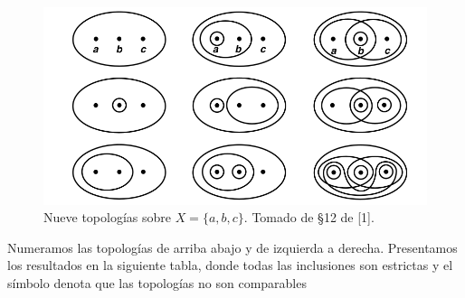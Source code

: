 \documentclass{article}
\newcommand{\xmark}{\ding{55}}
\begin{document}
\begin{figure}[h]
\centering \includegraphics{fig1.png}
\caption{Nueve topologías sobre $X = \{a, b, c\}$. Tomado de §12 de [1]. }
\end{figure}
Numeramos las topologías de arriba abajo y de izquierda a derecha. Presentamos los resultados en la siguiente tabla, donde todas las inclusiones son estrictas y  el símbolo \textcolor{red}{\xmark} denota que las topologías no son comparables
\end{document}

